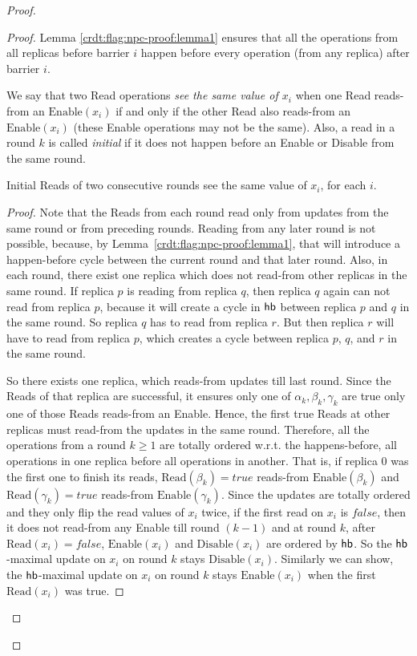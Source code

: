 \begin{proof}
\begin{proof}
Lemma \ref{crdt:flag:npc-proof:lemma1} ensures that all the operations from all replicas before barrier $i$ happen before every operation (from any replica) after barrier $i$.

We say that two \textrm{Read} operations \emph{see the same value of $x_i$} when one \textrm{Read} reads-from an $\mathrm{Enable}(x_i)$ if and only if the other \textrm{Read} also reads-from an $\mathrm{Enable}(x_i)$ (these \textrm{Enable} operations may not be the same). Also, a read in a round $k$ is called \emph{initial} if it does not happen before an \textrm{Enable} or \textrm{Disable} from the same round.

  \begin{lemma}
    \label{crdt:flag:npc-proof:lemma2}
    Initial \textrm{Read}s of two consecutive rounds see the same value of $x_i$, for each $i$.
  \end{lemma}

  \begin{proof}
  Note that the \textrm{Read}s from each round read only from updates from the same round or from preceding rounds. Reading from any later round is not possible, because, by Lemma~\ref{crdt:flag:npc-proof:lemma1},  that will introduce a happen-before cycle between the current round and that later round. Also, in each round, there exist one replica which does not read-from other replicas in the same round. If replica $p$ is reading from replica $q$, then replica $q$ again can not read from replica $p$, because it will create a cycle in $\textsf{hb}$ between replica $p$ and $q$ in the same round. So replica $q$ has to read from replica $r$. But then replica $r$ will have to read from replica $p$, which creates a cycle between replica $p$, $q$, and $r$ in the same round.

    So there exists one replica, which reads-from updates till last round. Since the \textrm{Read}s of that replica are successful, it ensures only one of $\alpha_k, \beta_k, \gamma_k$ are true \ie only one of those \textrm{Read}s reads-from an \textrm{Enable}. Hence, the first true \textrm{Read}s at other replicas must read-from the updates in the same round. Therefore, all the operations from a round $k \geq 1$ are totally ordered w.r.t. the happens-before, all operations in one replica before all operations in another.  That is, if replica 0 was the first one to finish its reads, $\mathrm{Read}(\beta_k) = true$ reads-from $\mathrm{Enable}(\beta_k)$ and $\mathrm{Read}(\gamma_k) = true$ reads-from $\mathrm{Enable}(\gamma_k)$. Since the updates are totally ordered and they only flip the read values of $x_i$ twice, \ie if the first read on $x_i$ is $false$, then it does not read-from any \textrm{Enable} till round $(k-1)$ and at round $k$, after $\mathrm{Read}(x_i) = false$, $\mathrm{Enable}(x_i)$ and $\mathrm{Disable}(x_i)$ are ordered by $\textsf{hb}$. So the $\textsf{hb}$-maximal update on $x_i$ on round $k$ stays $\mathrm{Disable}(x_i)$. Similarly we can show, the $\textsf{hb}$-maximal update on $x_i$ on round $k$ stays $\mathrm{Enable}(x_i)$ when the first $\mathrm{Read}(x_i)$ was true.


\end{proof}
\end{proof}
\end{proof}
